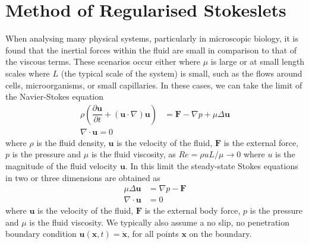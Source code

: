 \FloatBarrier
\section{Method of Regularised Stokeslets} \label{sec:MRS}

When analysing many physical systems, particularly in microscopic biology, it is found that the inertial forces within the fluid are small in comparison to that of the viscous terms. These scenarios occur either where $\mu$ is large or at small length scales where $L$ (the typical scale of the system) is small, such as the flows around cells, microorganisms, or small capillaries\cite{Blake1972AOrganisms, Higdon1979APropulsion, Smith2009MathematicalFluids}.
In these cases, we can take the limit of the Navier-Stokes equation 
\begin{equation}
\label{eq:NavierStokes}
\begin{aligned}
    \rho \left(\dfrac{\partial \mathbf{u}}{\partial t}+(\mathbf{u} \cdot \nabla) \mathbf{u}\right) &= \mathbf{F}-\nabla p+\mu  \Delta \mathbf{u}\\
    \nabla\cdot\mathbf{u} = 0
\end{aligned}
\end{equation}
where $\rho$ is the fluid density, $\mathbf{u}$ is the velocity of the fluid, $\mathbf{F}$ is the external force, $p$ is the pressure and $\mu$ is the fluid viscosity, as $Re=\rho u L/\mu \to 0 $ where $u$ is the magnitude of the fluid velocity $\mathbf{u}$\cite{Trombley2019BasicFlows}.
In this limit the steady-state Stokes equations in two or three dimensions are obtained as 
\begin{subequations}
\label{eq:StokesFlow}
\begin{align}
    \mu\Delta\boldsymbol{u} &= \nabla p - \boldsymbol{F} \label{eq:StokesFlow1} \\
    \nabla \cdot \boldsymbol{u} &= 0 \label{eq:StokesFlow2}
\end{align}
\end{subequations}
where $\bm{u}$ is the velocity of the fluid, $\bm{F}$ is the external body force, $p$ is the pressure and $\mu$ is the fluid viscosity. We typically also assume a no slip, no penetration boundary condition $\bm{u}(\bm{x},t)=\dot{\bm{x}}$, for all points $\bm{x}$ on the boundary. 

